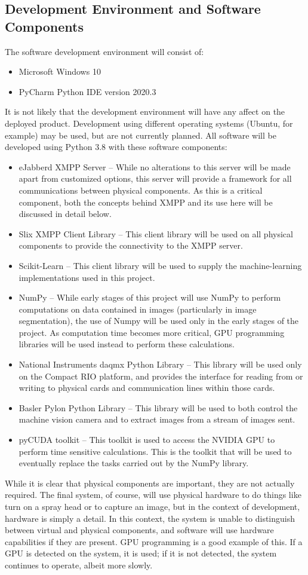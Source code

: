 \documentclass[12pt]{article}
\begin{document}
{\subsection{Development Environment and Software Components}
The software development environment will consist of:
\begin{itemize}
	\item{Microsoft Windows 10}
	\item{PyCharm Python IDE version 2020.3}
\end{itemize}
It is not likely that the development environment will have any affect on the deployed product.  Development using different operating systems (Ubuntu, for example) may be used, but are not currently planned.
All software will be developed using Python 3.8 with these software components:
\begin{itemize}
	\item{eJabberd XMPP Server -- While no alterations to this server will be made apart from customized options, this server will provide a framework for all communications between physical components.  As this is a critical component, both the concepts behind XMPP and its use here will be discussed in detail below.}
	\item{Slix XMPP Client Library -- This client library will be used on all physical components to provide the connectivity to the XMPP server.}
	\item{Scikit-Learn -- This client library will be used to supply the machine-learning implementations used in this project.}
	\item{NumPy -- While early stages of this project will use NumPy to perform computations on data contained in images (particularly in image segmentation), the use of Numpy will be used only in the early stages of the project. As computation time becomes more critical, GPU programming libraries will be used instead to perform these calculations.}
	\item{National Instruments daqmx Python Library -- This library will be used only on the Compact RIO platform, and provides the interface for reading from or writing to physical cards and communication lines within those cards.}
	\item{Basler Pylon Python Library -- This library will be used to both control the machine vision camera and to extract images from a stream of images sent.}
	\item{pyCUDA toolkit -- This toolkit is used to access the NVIDIA GPU to perform time sensitive calculations. This is the toolkit that will be used to eventually replace the tasks carried out by the NumPy library.}
\end{itemize}
While it is clear that physical components are important, they are not actually required. The final system, of course, will use physical hardware to do things like turn on a spray head or to capture an image, but in the context of development, hardware is simply a detail. In this context, the system is unable to distinguish between virtual and physical components, and software will use hardware capabilities if they are present. GPU programming is a good example of this. If a GPU is detected on the system, it is used; if it is not detected, the system continues to operate, albeit more slowly. 

}
\end{document}
